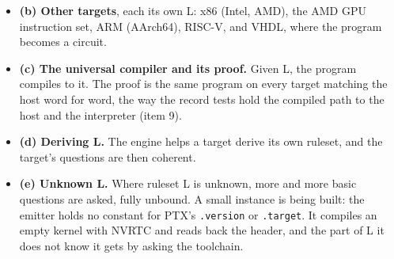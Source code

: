 \begin{enumerate}
\begin{itemize}
\item \textbf{(b) Other targets}, each its own L: x86 (Intel, AMD), the AMD GPU instruction set, ARM (AArch64), RISC-V, and VHDL, where the program becomes a circuit.
\item \textbf{(c) The universal compiler and its proof.} Given L, the program compiles to it. The proof is the same program on every target matching the host word for word, the way the record tests hold the compiled path to the host and the interpreter (item 9).
\item \textbf{(d) Deriving L.} The engine helps a target derive its own ruleset, and the target's questions are then coherent.
\item \textbf{(e) Unknown L.} Where ruleset L is unknown, more and more basic questions are asked, fully unbound. A small instance is being built: the emitter holds no constant for PTX's \texttt{.\allowbreak{}version} or \texttt{.\allowbreak{}target}. It compiles an empty kernel with NVRTC and reads back the header, and the part of L it does not know it gets by asking the toolchain.


\end{itemize}
\end{enumerate}
